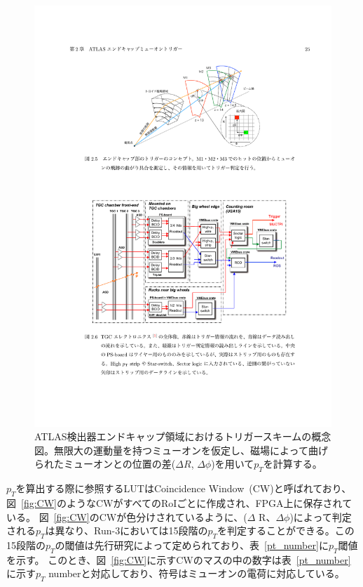 \begin{figure}[tb]
  \centering
  \includegraphics[clip, width=15cm]{fig/3/akatsuka_mt_trigger_scheme.pdf}
  \caption{ATLAS検出器エンドキャップ領域におけるトリガースキームの概念図\cite{article:akatsuka-mron}。無限大の運動量を持つミューオンを仮定し、磁場によって曲げられたミューオンとの位置の差($\Delta R$, $\Delta \phi$)を用いて$p_T$を計算する。}
  \label{fig:trigger-scheme}
\end{figure}


$p_T$を算出する際に参照するLUTはCoincidence Window~(CW)と呼ばれており、図~\ref{fig:CW}のようなCWがすべてのRoIごとに作成され、FPGA上に保存されている。
図~\ref{fig:CW}のCWが色分けされているように、($\Delta$ R、$\Delta \phi$)によって判定される$p_T$は異なり、Run-3においては15段階の$p_T$を判定することができる。この15段階の$p_T$の閾値は先行研究\cite{article:shiomi-mron}によって定められており、表~\ref{pt_number}に$p_T$閾値を示す。
このとき、図~\ref{fig:CW}に示すCWのマスの中の数字は表~\ref{pt_number}に示す$p_T$ numberと対応しており、符号はミューオンの電荷に対応している。

